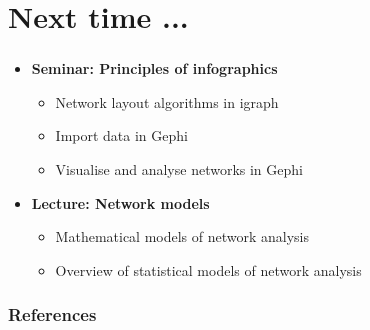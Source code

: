 \documentclass[8pt]{beamer}
\begin{document}
\section*{Next time ...}


\bgroup
{}
\begin{frame}[plain]{}
\begin{center}
\color{white}{\Huge\insertsection}
\end{center}
\end{frame}
\egroup


\begin{frame}
\frametitle{\insertsection}

\begin{itemize}

\item 	\textbf{Seminar: Principles of infographics}
	\begin{itemize}
	\item Network layout algorithms in igraph
	\item Import data in Gephi
	\item Visualise and analyse networks in Gephi
	\end{itemize}
	

\medskip
\medskip

\item 	\textbf{Lecture: Network models}
	\begin{itemize}
	\item Mathematical models of network analysis
	\item Overview of statistical models of network analysis
	\end{itemize}	
		
\end{itemize}

\end{frame}







\begin{frame}[allowframebreaks]
\frametitle{References}
\tiny


\end{frame}
\end{document}
